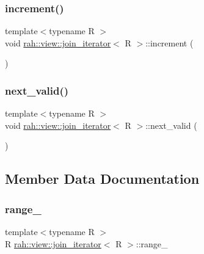 \subsubsection{\texorpdfstring{increment()}{increment()}}
{\footnotesize\ttfamily template$<$typename R $>$ \\
void \mbox{\hyperlink{structrah_1_1view_1_1join__iterator}{rah\+::view\+::join\+\_\+iterator}}$<$ R $>$\+::increment (\begin{DoxyParamCaption}{ }\end{DoxyParamCaption})\hspace{0.3cm}{\ttfamily [inline]}}

\mbox{\label{structrah_1_1view_1_1join__iterator_a6b3ef13305f87d011e2fecdb28b5dec6}} 
\subsubsection{\texorpdfstring{next\_valid()}{next\_valid()}}
{\footnotesize\ttfamily template$<$typename R $>$ \\
void \mbox{\hyperlink{structrah_1_1view_1_1join__iterator}{rah\+::view\+::join\+\_\+iterator}}$<$ R $>$\+::next\+\_\+valid (\begin{DoxyParamCaption}{ }\end{DoxyParamCaption})\hspace{0.3cm}{\ttfamily [inline]}}



\subsection{Member Data Documentation}
\mbox{\label{structrah_1_1view_1_1join__iterator_ad167fb9c44c21ad59d5acfa9031e9153}} 
\subsubsection{\texorpdfstring{range\_}{range\_}}
{\footnotesize\ttfamily template$<$typename R $>$ \\
R \mbox{\hyperlink{structrah_1_1view_1_1join__iterator}{rah\+::view\+::join\+\_\+iterator}}$<$ R $>$\+::range\+\_\+}

